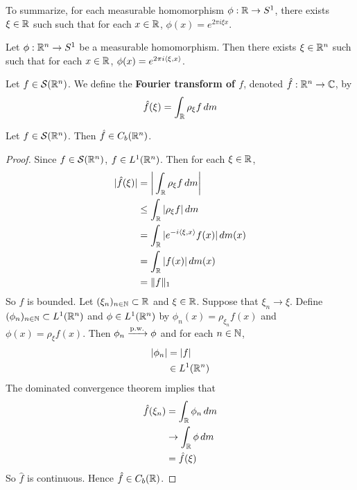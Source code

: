 \documentclass{book}
\begin{document}
	\begin{note}
		To summarize, for each measurable homomorphism $\phi:\mathbb{R} \rightarrow S^1$, there exists $\xi \in \mathbb{R}$ such  such that for each $x \in \mathbb{R}$, $\phi(x) = e^{2 \pi i  \xi x}$. 
	\end{note}

	\begin{ex}
		Let $\phi:\mathbb{R}^n \rightarrow S^1$ be a measurable homomorphism. Then there exists $\xi \in \mathbb{R}^n$ such such that for each $x \in \mathbb{R}$, $\phi(x) = e^{2 \pi i \langle \xi,  x \rangle}$. 
	\end{ex}
	
	\begin{defn}
		Let $f \in \mathcal{S}(\mathbb{R}^n)$. We define the \textbf{Fourier transform of $f$}, denoted $\hat{f} : \mathbb{R}^n \rightarrow \mathbb{C}$, by $$ \hat{f}(\xi) = \int_{\mathbb{R}} \rho_{\xi} f \, dm$$ 
	\end{defn}

	\begin{ex}
		Let $f \in \mathcal{S}(\mathbb{R}^n)$. Then $\hat{f} \in C_b(\mathbb{R}^n)$.
	\end{ex}

	\begin{proof}
		Since $f \in \mathcal{S}(\mathbb{R}^n)$, $f \in L^1(\mathbb{R}^n)$. Then for each $\xi \in \mathbb{R}$,
		\begin{align*}
			|\hat{f}(\xi)| 
			& = \bigg| \int_{\mathbb{R}} \rho_{\xi}f \, d m \bigg| \\
			& \leq  \int_{\mathbb{R}} |\rho_{\xi} f| \, d m \\
			& = \int_{\mathbb{R}} |e^{-i \langle \xi,  x\rangle}f(x)| \, d m(x) \\
			& = \int_{\mathbb{R}} |f(x)| \, d m(x) \\
			& = \|f\|_1
		\end{align*}
		So $f$ is bounded. Let $(\xi_n)_{n \in \mathbb{N}} \subset \mathbb{R}$ and $\xi \in \mathbb{R}$. Suppose that $\xi_n \rightarrow \xi$. Define $(\phi_n)_{n \in \mathbb{N}} \subset L^1(\mathbb{R}^n)$ and $\phi \in L^1(\mathbb{R}^n)$ by $\phi_n(x) = \rho_{\xi_n}f(x)$ and $\phi(x) = \rho_{\xi}f(x)$. Then $\phi_n \xrightarrow{\text{p.w.}} \phi$ and for each $n \in \mathbb{N}$, 
		\begin{align*}
			|\phi_n|
			& = |f| \\
			& \in L^1(\mathbb{R}^n)
		\end{align*}
		The dominated convergence theorem implies that 
		\begin{align*}
			\hat{f}(\xi_n)
			& = \int_{\mathbb{R}} \phi_n \, d m \\
			& \rightarrow \int_{\mathbb{R}} \phi \, d m \\
			& = \hat{f}(\xi)
		\end{align*}
		So $\hat{f}$ is continuous. Hence $\hat{f} \in C_b(\mathbb{R})$.
	\end{proof}
\end{document}
